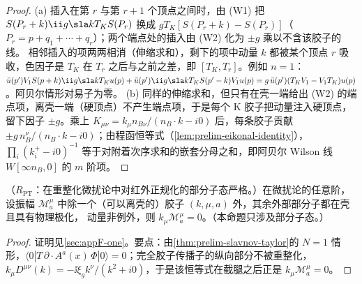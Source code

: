\begin{proof}
(a) 插入在第 $r$ 与第 $r+1$ 个顶点之间时，由 (W1) 把 $S(P_r+k)\ii g\sla kT_KS(P_r)$ 换成 $gT_K[S(P_r+k)-S(P_r)]$（$P_r=p+q_1+\cdots+q_r$）；两个端点处的插入由 (W2) 化为 $\pm g$ 乘以不含该胶子的线。
相邻插入的项两两相消（伸缩求和），剩下的项中动量 $k$ 都被某个顶点 $r$ 吸收，色因子是 $T_K$ 在 $T_r$ 之后与之前之差，即 $[T_K,T_r]$。例如 $n=1$：
$\bar u(p')V_1S(p+k)\ii g\sla kT_Ku(p)+\bar u(p')\ii g\sla kT_KS(p'-k)V_1u(p)=g\,\bar u(p')(T_KV_1-V_1T_K)u(p)$。阿贝尔情形对易子为零。
(b) 同样的伸缩求和，但只有在壳一端给出 (W2) 的端点项，离壳一端（硬顶点）不产生端点项，于是每个 K 胶子把动量注入硬顶点，留下因子 $\pm g$。乘上
$K_{\mu\nu}=k_\mu n_{B\nu}/(n_B\cdot k-i0)$ 后，每条胶子贡献 $\pm g\,n_B^\nu/(n_B\cdot k-i0)$；由程函恒等式（\cref{lem:prelim-eikonal-identity}），
$\prod_i(k_i^+-i0)^{-1}$ 等于对附着次序求和的嵌套分母之和，即阿贝尔 Wilson 线 $W[\infty n_B,0]$ 的 $m$ 阶项。
\end{proof}

\begin{proposition}\label{prop:method-ward-one}
（$R_{\mathrm{PT}}$：在重整化微扰论中对红外正规化的部分子态严格。）在微扰论的任意阶，设振幅 $\mathcal M^\mu_a$ 中除一个（可以离壳的）胶子 $(k,\mu,a)$ 外，其余外部部分子都在壳且具有物理极化，
动量非例外，则 $k_\mu\mathcal M^\mu_a=0$。（本命题只涉及部分子态。）
\end{proposition}

\begin{proof}
证明见\cref{sec:appF-one}。要点：由\cref{thm:prelim-slavnov-taylor}的 $N=1$ 情形，$\langle0|T\,\partial\cdot A^a(x)\,\Phi|0\rangle=0$；完全胶子传播子的纵向部分不被重整化，
$k_\mu D^{\mu\nu}(k)=-\ii\xi_gk^\nu/(k^2+i0)$，于是该恒等式在截腿之后正是 $k_\mu\mathcal M^\mu_a=0$。
\end{proof}

